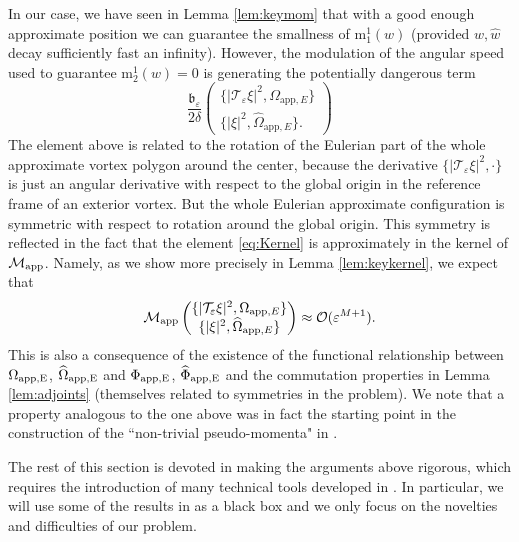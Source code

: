 \documentclass[11pt,reqno,a4paper]{amsart}
\def\eps{\varepsilon}
\newcommand{\cM}{\mathcal{M}}
\newcommand{\cO}{\mathcal{O}}
\newcommand{\cT}{\mathcal{T}}
\newcommand{\app}{\mathrm{app}}
\newcommand{\mrm}{\mathrm{m}}
\newcommand{\1}{\mathbbm{1}}
\theoremstyle{definition}
\theoremstyle{definition}
\numberwithin{equation}{section}
\begin{document}
In our case, we have seen in Lemma \ref{lem:keymom} that with a good enough approximate position we can guarantee the smallness of $\mrm_1^1(w)$ (provided $w,\widehat{w}$ decay sufficiently fast an infinity). However, the modulation of the angular speed used to guarantee $\mrm_2^1(w)=0$ is generating  the potentially dangerous term 
\begin{equation}
\label{eq:Kernel}
    \frac{\mathfrak{b_\eps}}{2\delta}\begin{pmatrix}
    \{|\cT_{\eps} \xi|^2,\Omega_{\app,E}\}\\
        \{|\xi|^2,\widehat{\Omega}_{\app,E}\}.
    \end{pmatrix}
\end{equation}
The element above is related to the rotation of the Eulerian part of the whole approximate vortex polygon around the center, because the derivative $\{|\cT_{\eps} \xi|^2,\cdot\}$ is just an angular derivative with respect to the global origin in the reference frame of an exterior vortex. But the whole Eulerian approximate configuration is symmetric with respect to rotation around the global origin. This symmetry is reflected in the fact that the element \cref{eq:Kernel} is approximately in the kernel of $\cM_{\rm app}$. Namely, as we show more precisely in Lemma \ref{lem:keykernel}, we expect that 
\begin{equation}
\label{eq:heuristic1}
    \cM_{\rm app}\begin{pmatrix}
        \{|\cT_{\eps} \xi|^2,\Omega_{\app,E}\}\\
        \{|\xi|^2,\widehat{\Omega}_{\app,E}\}
    \end{pmatrix}\approx \cO(\eps^{M+1}).
\end{equation}
This is also a consequence of the existence of the functional relationship between $\Omega_{\rm app,E}$, $ \widehat{\Omega}_{\rm app,E}$ and $\Phi_{\rm app,E}$, $ \widehat{\Phi}_{\rm app,E}$ and the commutation properties in Lemma \ref{lem:adjoints} (themselves related to symmetries in the problem). We note that a property analogous to the one above was in fact the starting point in the construction of the ``non-trivial pseudo-momenta" in \cite{zhang2025long}.

The rest of this section is devoted in making the arguments above rigorous, which requires the introduction of many technical tools developed in \cite{GaSring,GalWay2002,dolce2024long}. In particular, we will use some of the results in \cite{dolce2024long} as a black box and we only  focus on the novelties and difficulties of our problem.
\end{document}
